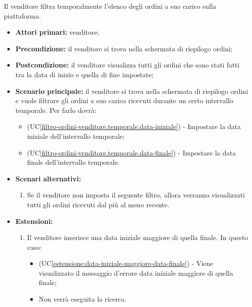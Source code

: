 Il venditore filtra temporalmente l'elenco degli ordini a suo carico sulla piattaforma.
\begin{itemize}
	\item \textbf{Attori primari:} venditore;
	\item \textbf{Precondizione:} il venditore si trova nella schermata di riepilogo ordini;
	\item \textbf{Postcondizione:} il venditore visualizza tutti gli ordini che sono stati fatti tra la data di inizio e quella di fine impostate;
	\item \textbf{Scenario principale:} il venditore si trova nella schermata di riepilogo ordini e vuole filtrare gli ordini a suo carico ricevuti durante un certo intervallo temporale. Per farlo dovrà:
	\begin{itemize}
		\item (UC\ref{filtro-ordini-venditore.temporale.data-iniziale}) - Impostare la data iniziale dell'intervallo temporale;
		\item (UC\ref{filtro-ordini-venditore.temporale.data-finale}) - Impostare la data finale dell'intervallo temporale.
	\end{itemize}
		\item \textbf{Scenari alternativi:}
	\begin{enumerate}[label=\lett]
		\item Se il venditore non imposta il seguente filtro, allora verranno visualizzati tutti gli ordini ricevuti dal più al meno recente.
	\end{enumerate}
	\item \textbf{Estensioni:}
	\begin{enumerate}[label=\lett]
		\item Il venditore inserisce una data iniziale maggiore di quella finale. In questo caso:
		\begin{itemize}
			\item (UC\ref{estensione:data-iniziale-maggiore-data-finale}) - Viene visualizzato il messaggio d'errore data iniziale maggiore di quella finale;
			\item Non verrà eseguita la ricerca.
		\end{itemize}
	\end{enumerate}
\end{itemize}

\label{filtro-ordini-venditore.temporale.data-iniziale}

